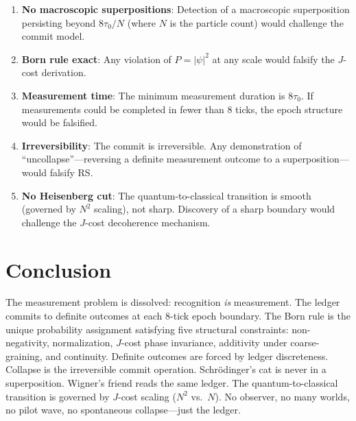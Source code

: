 \documentclass[12pt,a4paper]{article}
\theoremstyle{definition}
\theoremstyle{remark}
\begin{document}
\begin{enumerate}
  \item \textbf{No macroscopic superpositions}: Detection of a
  macroscopic superposition persisting beyond $8\tau_0/N$ (where
  $N$ is the particle count) would challenge the commit model.

  \item \textbf{Born rule exact}: Any violation of
  $P = |\psi|^2$ at any scale would falsify the $J$-cost
  derivation.

  \item \textbf{Measurement time}: The minimum measurement duration
  is $8\tau_0$.  If measurements could be completed in fewer than
  8 ticks, the epoch structure would be falsified.

  \item \textbf{Irreversibility}: The commit is irreversible.
  Any demonstration of ``uncollapse''---reversing a definite
  measurement outcome to a superposition---would falsify RS.

  \item \textbf{No Heisenberg cut}: The quantum-to-classical
  transition is smooth (governed by $N^2$ scaling), not sharp.
  Discovery of a sharp boundary would challenge the $J$-cost
  decoherence mechanism.
\end{enumerate}

\section{Conclusion}
\label{sec:conclusion}

The measurement problem is dissolved: recognition \emph{is}
measurement.  The ledger commits to definite outcomes at each
8-tick epoch boundary.  The Born rule is the unique probability
assignment satisfying five structural constraints: non-negativity,
normalization, $J$-cost phase invariance, additivity under
coarse-graining, and continuity.  Definite outcomes are forced by ledger
discreteness.  Collapse is the irreversible commit operation.
Schr\"odinger's cat is never in a superposition.  Wigner's friend
reads the same ledger.  The quantum-to-classical transition is
governed by $J$-cost scaling ($N^2$ vs.\ $N$).  No observer, no
many worlds, no pilot wave, no spontaneous collapse---just the
ledger.
\end{document}

